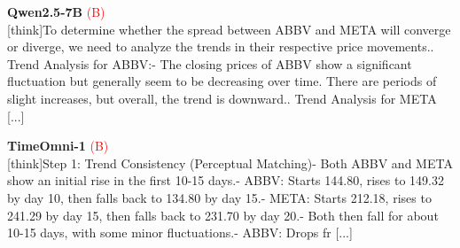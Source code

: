 \noindent
\begin{minipage}[t]{0.28\textwidth}
\colorbox{red!8}{\parbox{\dimexpr\textwidth-2\fboxsep}{
\textbf{Qwen2.5-7B} \textcolor{red}{(B)} \\[2pt]
\tiny
[think]\newline To determine whether the spread between ABBV and META will converge or diverge, we need to analyze the trends in their respective price movements.. Trend Analysis for ABBV:\newline    - The closing prices of ABBV show a significant fluctuation but generally seem to be decreasing over time. There are periods of slight increases, but overall, the trend is downward.. Trend Analysis for META [...]
}}
\end{minipage}
\hfill
\begin{minipage}[t]{0.28\textwidth}
\colorbox{red!8}{\parbox{\dimexpr\textwidth-2\fboxsep}{
\textbf{TimeOmni-1} \textcolor{red}{(B)} \\[2pt]
\tiny
[think]\newline Step 1: Trend Consistency (Perceptual Matching)\newline - Both ABBV and META show an initial rise in the first 10-15 days.\newline     - ABBV: Starts  144.80, rises to  149.32 by day 10, then falls back to  134.80 by day 15.\newline     - META: Starts  212.18, rises to  241.29 by day 15, then falls back to  231.70 by day 20.\newline - Both then fall for about 10-15 days, with some minor fluctuations.\newline     - ABBV: Drops fr [...]
}}
\end{minipage}
\hfill
